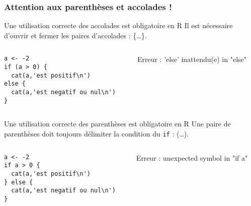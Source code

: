 \documentclass[10pt]{beamer}
\begin{document}
\begin{frame}[fragile]
  \frametitle{Attention aux parenthèses et accolades !}
  \begin{block}{Une utilisation correcte des accolades est obligatoire en R}
    Il est nécessaire d’ouvrir et fermer les paires d’accolades : \{\dots\}.
    \begin{columns}[c]
      \begin{column}{0.55\textwidth}
        \begin{lstlisting}[style=editor, escapechar=?]
a <- -2
if (a > 0) {
  cat(a,'est positif\n')
else {
  cat(a,'est negatif ou nul\n')
}
\end{lstlisting}
\end{column}
\begin{column}{0.45\textwidth}
\RUN
\alert{Erreur : 'else' inattendu(e) in "else"}
\end{column}
\end{columns}
\end{block}

\begin{block}{Une utilisation correcte des parenthèses est obligatoire en R}
    Une paire de parenthèses doit toujours délimiter la condition du \texttt{if} : (\dots).
    \begin{columns}[c]
      \begin{column}{0.55\textwidth}
        \begin{lstlisting}[style=editor, escapechar=?]
a <- -2
if a > 0 {
  cat(a,'est positif\n')
} else {
  cat(a,'est negatif ou nul\n')
}
\end{lstlisting}
\end{column}
\begin{column}{0.45\textwidth}
\RUN
\alert{Erreur : unexpected symbol in "if a"}
\end{column}
\end{columns}
\end{block}

\end{frame}

\end{document}

